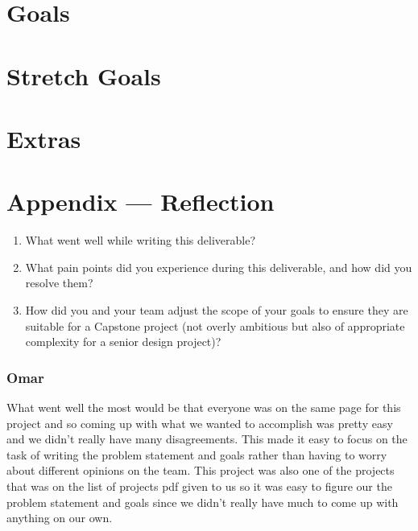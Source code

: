 \documentclass{article}
\begin{document}
\section{Goals}

\section{Stretch Goals}

\section{Extras}



\newpage{}

\section*{Appendix --- Reflection}




\begin{enumerate}
    \item What went well while writing this deliverable? 
    \item What pain points did you experience during this deliverable, and how
    did you resolve them?
    \item How did you and your team adjust the scope of your goals to ensure
    they are suitable for a Capstone project (not overly ambitious but also of
    appropriate complexity for a senior design project)?
\end{enumerate}  



\subsubsection*{Omar}
\hspace{2em} What went well the most would be that everyone was on the same page for this project and so coming up with what we wanted to accomplish was pretty easy and we didn't really have many disagreements. This made it easy to focus on the task of writing the problem statement and goals rather than having to worry about different opinions on the team. This project was also one of the projects that was on the list of projects pdf given to us so it was easy to figure our the problem statement and goals since we didn't really have much to come up with anything on our own. 
\end{document}
